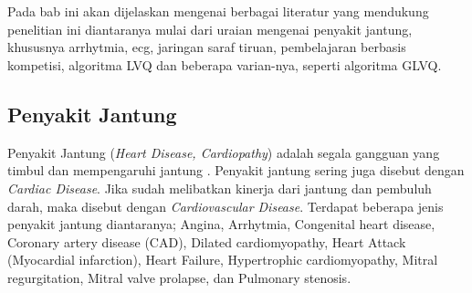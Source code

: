 \chapter{\babDua}
Pada bab ini akan dijelaskan mengenai berbagai literatur yang mendukung
penelitian ini diantaranya mulai dari uraian mengenai penyakit jantung,
khususnya \gls{arrhytmia}, \gls{ecg}, jaringan saraf tiruan,
pembelajaran berbasis kompetisi, algoritma \gls{LVQ} dan beberapa varian-nya, seperti algoritma \gls{GLVQ}. 

\section{Penyakit Jantung}
\label{sec:jantung}
Penyakit Jantung (\textit{Heart Disease, Cardiopathy}) adalah segala gangguan
yang timbul dan mempengaruhi jantung \cite{medicinenet.1}. Penyakit jantung
sering juga disebut dengan \textit{Cardiac Disease}. Jika sudah melibatkan
kinerja dari jantung dan pembuluh darah, maka disebut dengan
\textit{Cardiovascular Disease}. Terdapat beberapa jenis penyakit jantung
diantaranya; Angina, Arrhytmia, Congenital heart disease, Coronary artery
disease (CAD), Dilated cardiomyopathy, Heart Attack (Myocardial infarction),
Heart Failure, Hypertrophic cardiomyopathy, Mitral regurgitation, Mitral valve
prolapse, dan Pulmonary stenosis. 

